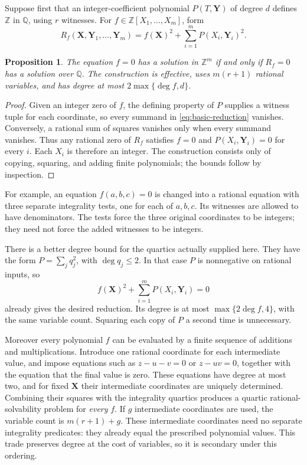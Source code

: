 \documentclass[11pt]{article}
\newtheorem{proposition}[theorem]{Proposition}
\theoremstyle{definition}
\newcommand{\Q}{\mathbb Q}
\newcommand{\Z}{\mathbb Z}
\begin{document}
Suppose first that an integer-coefficient polynomial
$P(T,\mathbf Y)$ of degree $d$ defines $\Z$ in $\Q$, using $r$
witnesses. For $f\in\Z[X_1,\ldots,X_m]$, form
\begin{equation}\label{eq:basic-reduction}
 R_f(\mathbf X,\mathbf Y_1,\ldots,\mathbf Y_m)
 =f(\mathbf X)^2+\sum_{i=1}^m P(X_i,\mathbf Y_i)^2.
\end{equation}
\begin{proposition}\label{prop:integer-rational-reduction}
The equation $f=0$ has a solution in $\Z^m$ if and only if
$R_f=0$ has a solution over $\Q$. The construction is effective,
uses $m(r+1)$ rational variables, and has degree at most
$2\max\{\deg f,d\}$.
\end{proposition}
\begin{proof}
Given an integer zero of $f$, the defining property of $P$ supplies
a witness tuple for each coordinate, so every summand in
\eqref{eq:basic-reduction} vanishes. Conversely, a rational sum of
squares vanishes only when every summand vanishes. Thus any rational
zero of $R_f$ satisfies $f=0$ and $P(X_i,\mathbf Y_i)=0$ for every
$i$. Each $X_i$ is therefore an integer. The construction consists
only of copying, squaring, and adding finite polynomials; the bounds
follow by inspection.
\end{proof}

For example, an equation $f(a,b,c)=0$ is changed into a rational
equation with three separate integrality tests, one for each of
$a,b,c$. Its witnesses are allowed to have denominators. The tests
force the three original coordinates to be integers; they need not
force the added witnesses to be integers.

There is a better degree bound for the quartics actually supplied
here. They have the form $P=\sum_j q_j^2$, with $\deg q_j\leq2$.
In that case $P$ is nonnegative on rational inputs, so
\begin{equation}\label{eq:sos-reduction}
 f(\mathbf X)^2+\sum_{i=1}^m P(X_i,\mathbf Y_i)=0
\end{equation}
already gives the desired reduction. Its degree is at most
$\max\{2\deg f,4\}$, with the same variable count. Squaring each
copy of $P$ a second time is unnecessary.

Moreover every polynomial $f$ can be evaluated by a finite sequence
of additions and multiplications. Introduce one rational coordinate
for each intermediate value, and impose equations such as
$z-u-v=0$ or $z-uv=0$, together with the equation that the final value
is zero. These equations have degree at most two, and for fixed
$\mathbf X$ their intermediate coordinates are uniquely determined.
Combining their squares with the integrality quartics produces a
quartic rational-solvability problem for \emph{every} $f$. If $g$
intermediate coordinates are used, the variable count is
$m(r+1)+g$. These intermediate coordinates need no separate
integrality predicates: they already equal the prescribed polynomial
values. This trade preserves degree at the cost of variables, so it
is secondary under this ordering.
\end{document}
